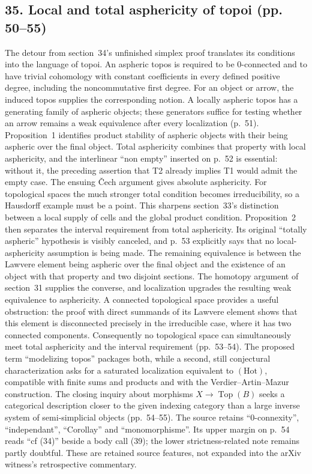 \documentclass[10pt,oneside]{book}
\begin{document}
\subsection*{35. Local and total asphericity of topoi (pp. 50--55)}
The detour from section~34's unfinished simplex proof translates its conditions into the language of topoi. An aspheric topos is required to be $0$-connected and to have trivial cohomology with constant coefficients in every defined positive degree, including the noncommutative first degree. For an object or arrow, the induced topos supplies the corresponding notion. A locally aspheric topos has a generating family of aspheric objects; these generators suffice for testing whether an arrow remains a weak equivalence after every localization (p.~51). Proposition~1 identifies product stability of aspheric objects with their being aspheric over the final object. Total asphericity combines that property with local asphericity, and the interlinear ``non empty'' inserted on p.~52 is essential: without it, the preceding assertion that T2 already implies T1 would admit the empty case. The ensuing \v{C}ech argument gives absolute asphericity. For topological spaces the much stronger total condition becomes irreducibility, so a Hausdorff example must be a point. This sharpens section~33's distinction between a local supply of cells and the global product condition. Proposition~2 then separates the interval requirement from total asphericity. Its original ``totally aspheric'' hypothesis is visibly canceled, and p.~53 explicitly says that no local-asphericity assumption is being made. The remaining equivalence is between the Lawvere element being aspheric over the final object and the existence of an object with that property and two disjoint sections. The homotopy argument of section~31 supplies the converse, and localization upgrades the resulting weak equivalence to asphericity. A connected topological space provides a useful obstruction: the proof with direct summands of its Lawvere element shows that this element is disconnected precisely in the irreducible case, where it has two connected components. Consequently no topological space can simultaneously meet total asphericity and the interval requirement (pp.~53--54). The proposed term ``modelizing topos'' packages both, while a second, still conjectural characterization asks for a saturated localization equivalent to $(\mathrm{Hot})$, compatible with finite sums and products and with the Verdier--Artin--Mazur construction. The closing inquiry about morphisms $X\to\operatorname{Top}(B)$ seeks a categorical description closer to the given indexing category than a large inverse system of semi-simplicial objects (pp.~54--55). The source retains ``0-connexity'', ``independant'', ``Corollay'' and ``monomorphisme''. Its upper margin on p.~54 reads ``cf (34)'' beside a body call (39); the lower strictness-related note remains partly doubtful. These are retained source features, not expanded into the arXiv witness's retrospective commentary.
\end{document}
